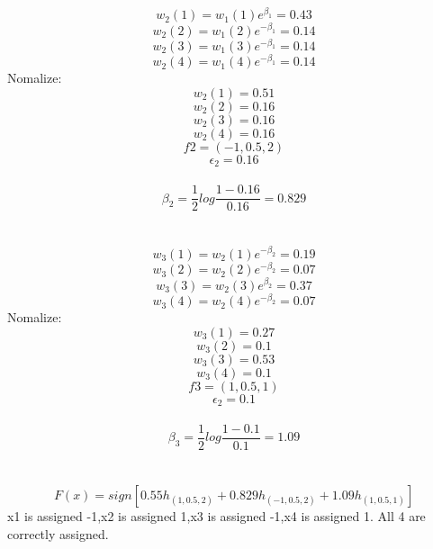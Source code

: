 \documentclass[11pt]{article}
\begin{document}
\\
	$$w_2(1)=w_1(1)e^{\beta_1}=0.43$$
	$$w_2(2)=w_1(2)e^{-\beta_1}=0.14$$
	$$w_2(3)=w_1(3)e^{-\beta_1}=0.14$$
	$$w_2(4)=w_1(4)e^{-\beta_1}=0.14$$
	Nomalize:
	$$w_2(1)=0.51$$
	$$w_2(2)=0.16$$
	$$w_2(3)=0.16$$
	$$w_2(4)=0.16$$
      $$f2=(-1,0.5,2)$$
	$$\epsilon_2=0.16$$\\
	$$\beta_2=\frac{1}{2}log{\frac{1-0.16}{0.16}}=0.829$$\\

\\
	$$w_3(1)=w_2(1)e^{-\beta_2}=0.19$$
	$$w_3(2)=w_2(2)e^{-\beta_2}=0.07$$
	$$w_3(3)=w_2(3)e^{\beta_2}=0.37$$
	$$w_3(4)=w_2(4)e^{-\beta_2}=0.07$$
	Nomalize:
	$$w_3(1)=0.27$$
	$$w_3(2)=0.1$$
	$$w_3(3)=0.53$$
	$$w_3(4)=0.1$$
      $$f3=(1,0.5,1)$$
	$$\epsilon_2=0.1$$\\
	$$\beta_3=\frac{1}{2}log{\frac{1-0.1}{0.1}}=1.09$$\\

\\
	$$ F(x)=sign[0.55h_{(1,0.5,2)}+0.829h_{(-1,0.5,2)}+1.09h_{(1,0.5,1)}]$$
	x1 is assigned -1,x2 is assigned 1,x3 is assigned -1,x4 is assigned 1. All 4 are correctly assigned.
	
\end{document}
